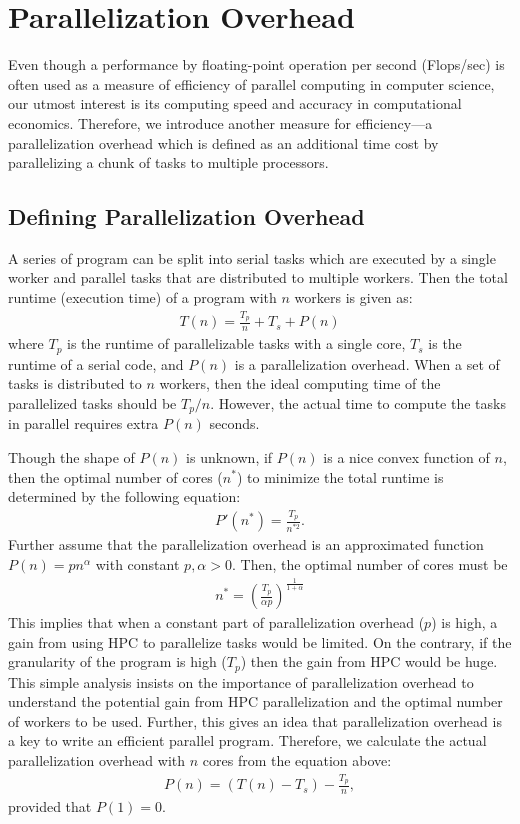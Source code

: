 \documentclass[12pt]{article}
\begin{document}
\clearpage
\section{Parallelization Overhead}
Even though a performance by floating-point operation per second (Flops/sec) is often used as a measure of efficiency of parallel computing in computer science, our utmost interest is its computing speed and accuracy in computational economics. Therefore, we introduce another measure for efficiency---a parallelization overhead which is defined as an additional time cost by parallelizing a chunk of tasks to multiple processors. 


\subsection{Defining Parallelization Overhead}
A series of program can be split into serial tasks which are executed by a single worker and parallel tasks that are distributed to multiple workers. Then the total runtime (execution time) of a program with $n$ workers is given as:
\begin{align*}
T(n) = \frac{T_p}{n} + T_s + P(n)
\end{align*}
where $T_p$ is the runtime of parallelizable tasks with a single core, $T_s$ is the runtime of a serial code, and $P(n)$ is a parallelization overhead. When a set of tasks is distributed to $n$ workers, then the ideal computing time of the parallelized tasks should be $T_p/n$. However, the actual time to compute the tasks in parallel requires extra $P(n)$ seconds.



Though the shape of $P(n)$ is unknown, if $P(n)$ is a nice convex function of $n$, then the optimal number of cores ($n^*$) to minimize the total runtime is determined by the following equation: 
\begin{align*}
P'(n^*) = \frac{T_p}{n^{*2}}.
\end{align*}
Further assume that the parallelization overhead is an approximated function $P(n)=pn^\alpha$ with constant $p,\alpha>0$. Then, the optimal number of cores must be
\begin{align*}
n^* = \left(\frac{T_p}{\alpha p} \right)^{\frac{1}{1+\alpha}}
\end{align*}
This implies that when a constant part of parallelization overhead ($p$) is high, a gain from using HPC to parallelize tasks would be limited. On the contrary, if the granularity of the program is high ($T_p$) then the gain from HPC would be huge. This simple analysis insists on the importance of parallelization overhead to understand the potential gain from HPC parallelization and the optimal number of workers to be used. Further, this gives an idea that parallelization overhead is a key to write an efficient parallel program. Therefore, we calculate the actual parallelization overhead with $n$ cores from the equation above:
\begin{align*}
P(n) = (T(n)-T_s) - \frac{T_p}{n},
\end{align*}
provided that $P(1)=0$.
\end{document}

